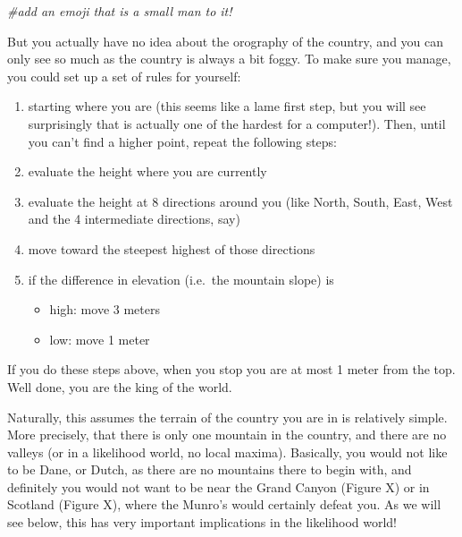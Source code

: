 \documentclass[
]{book}
\newenvironment{Shaded}{\begin{snugshade}}{\end{snugshade}}
\newcommand{\CommentTok}[1]{\textcolor[rgb]{0.56,0.35,0.01}{\textit{#1}}}
\providecommand{\tightlist}{%
  \setlength{\itemsep}{0pt}\setlength{\parskip}{0pt}}
\begin{document}
\begin{Shaded}
\begin{Highlighting}[]
\CommentTok{\#add an emoji that is a small man to it!}
\end{Highlighting}
\end{Shaded}

But you actually have no idea about the orography of the country, and you can only see so much as the country is always a bit foggy. To make sure you manage, you could set up a set of rules for yourself:

\begin{enumerate}
\def\labelenumi{\arabic{enumi}.}
\tightlist
\item
  starting where you are (this seems like a lame first step, but you will see surprisingly that is actually one of the hardest for a computer!). Then, until you can't find a higher point, repeat the following steps:
\item
  evaluate the height where you are currently
\item
  evaluate the height at 8 directions around you (like North, South, East, West and the 4 intermediate directions, say)
\item
  move toward the steepest highest of those directions
\item
  if the difference in elevation (i.e.~the mountain slope) is

  \begin{itemize}
  \tightlist
  \item
    high: move 3 meters
  \item
    low: move 1 meter
  \end{itemize}
\end{enumerate}

If you do these steps above, when you stop you are at most 1 meter from the top. Well done, you are the king of the world.

Naturally, this assumes the terrain of the country you are in is relatively simple. More precisely, that there is only one mountain in the country, and there are no valleys (or in a likelihood world, no local maxima). Basically, you would not like to be Dane, or Dutch, as there are no mountains there to begin with, and definitely you would not want to be near the Grand Canyon (Figure X) or in Scotland (Figure X), where the Munro's would certainly defeat you. As we will see below, this has very important implications in the likelihood world!
\end{document}
